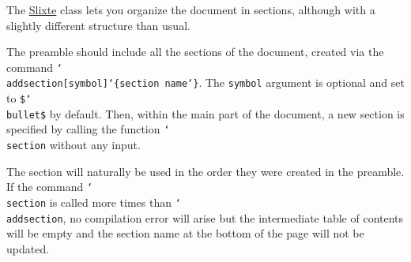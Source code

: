 \documentclass{slixte}
\def\clsurl{https://ctan.org/pkg/slixte}
\newcommand{\codetext}[1]{\texttt{\color{second}#1}}
\newcommand{\cmdt}[1]{\char`\\#1}
\newcommand{\cbrl}{\char`\{}
\newcommand{\cbrr}{\char`\}}
\newcommand{\cbrt}[1]{\cbrl#1\cbrr}
\newcommand{\codeline}[2][0]{\spacing[0.1]\hspace{-1.2cm}\codetext{\foreach\i in {0,...,#1}{~~~~}#2}\par}
\newcommand{\slixte}{\href{\clsurl}{\color{first}Slixte}}
\begin{document}
\hypertarget{basic:section}{}
\begin{slide}[Sections]
    The \slixte{} class lets you organize the document in sections, although with a slightly different structure than usual.
    \begin{itemize}
        \fillitem The preamble should include all the sections of the document, created via the command \codetext{\cmdt{addsection}[symbol]\cbrt{section name}}. The \codetext{symbol} argument is optional and set to \codetext{\$\cmdt{bullet}\$} by default.
        \fillitem Then, within the main part of the document, a new section is specified by calling the function \codetext{\cmdt{section}} without any input.
        \begin{itemize}
            \emptyitem The section will naturally be used in the order they were created in the preamble.
            \emptyitem If the command \codetext{\cmdt{section}} is called more times than \codetext{\cmdt{addsection}}, no compilation error will arise but the intermediate table of contents will be empty and the section name at the bottom of the page will not be updated.  
        \end{itemize}
    \end{itemize}
\end{slide}

\iftoggle{examples}{
\begin{slide}[Sections (example)]
    Try adding the following code within your preamble.

    \spacing

    \codeline{\cmdt{addsection}\cbrt{A standard section}}
    \codeline{\cmdt{addsection}[\$\cmdt{times}\$]\cbrt{A section symbolized by a cross}}

    \spacing[1]

    And add this code within your main document.

    \spacing

    \codeline{\cmdt{section}}
    \codeline{\cmdt{begin}\cbrt{slide}[A standard slide]\cmdt{end}\cbrt{slide}}
    \codeline{\cmdt{section}}
    \codeline{\cmdt{begin}\cbrt{slide}[A slide from the cross section]\cmdt{end}\cbrt{slide}}
    \codeline{\cmdt{section}}
    \codeline{\cmdt{begin}\cbrt{slide}[An unclear slide]\cmdt{end}\cbrt{slide}}
\end{slide}
}{}
\end{document}
